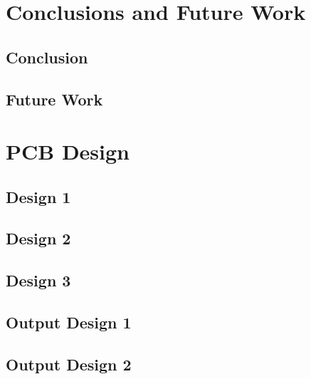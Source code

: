 \documentclass[12pt,openany,a4paper]{book}
\begin{document}









\chapter{Conclusions and Future Work}

\section{Conclusion}

\section{Future Work}







\appendix
{}


\newpage
\chapter{PCB Design}
\section{Design 1}	\label{sec:pcb_design1}

\section{Design 2}	\label{sec:pcb_design2}

\section{Design 3}	\label{sec:pcb_design3}

\section{Output Design 1}	\label{sec:pcb_outdesign1}

\section{Output Design 2}	\label{sec:pcb_outdesign2}
\end{document}
